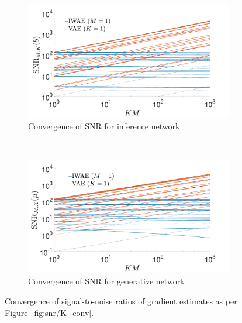 \begin{figure}[h]
	\centering
	\begin{subfigure}[b]{0.45\textwidth}
		\centering
		\includegraphics[width=\textwidth]{figures/tighter_bounds/hv_b_conv}
		\caption{Convergence of \gls{SNR} for inference network \label{fig:hv/b}}
	\end{subfigure} ~~~~~~~~~~
	\begin{subfigure}[b]{0.45\textwidth}
		\centering
		\includegraphics[width=\textwidth]{figures/tighter_bounds/hv_mu_conv}
		\caption{Convergence of \gls{SNR} for generative network\label{fig:hv/mu}}
	\end{subfigure}
	\caption{Convergence of signal-to-noise ratios of gradient estimates
		as per Figure~\ref{fig:snr/K_conv}.
		\label{fig:hv/K_conv}}
\end{figure}


